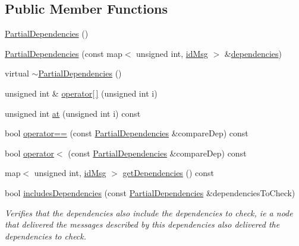 \subsection*{Public Member Functions}
\begin{DoxyCompactItemize}
\item 
\hyperlink{class_partial_dependencies_aefb05dec194a9ab63482df6645cbd842}{Partial\+Dependencies} ()
\item 
\hyperlink{class_partial_dependencies_a1f17aad6d01c7e8cdc40bf99138eb528}{Partial\+Dependencies} (const map$<$ unsigned int, \hyperlink{structures_8h_a83a1d9a070efa5341da84cfd8e28d3e5}{id\+Msg} $>$ \&\hyperlink{class_partial_dependencies_a4b72531ce3a3b7c4b6f02d0fe8ea1a7c}{dependencies})
\item 
virtual \hyperlink{class_partial_dependencies_a8fa3da23d89db5b71b42e234617755f7}{$\sim$\+Partial\+Dependencies} ()
\item 
unsigned int \& \hyperlink{class_partial_dependencies_afafbc86f0bc7c649bcfbddbb90125e8f}{operator\mbox{[}$\,$\mbox{]}} (unsigned int i)
\item 
unsigned int \hyperlink{class_partial_dependencies_ac0a0d04664f3a953596ca26224f5ed7d}{at} (unsigned int i) const
\item 
bool \hyperlink{class_partial_dependencies_a432719e4e5fdcd9cdb0d3a5ce2a5c8af}{operator==} (const \hyperlink{class_partial_dependencies}{Partial\+Dependencies} \&compare\+Dep) const
\item 
bool \hyperlink{class_partial_dependencies_af8f87bc4a622db0f56276502c6655f38}{operator$<$} (const \hyperlink{class_partial_dependencies}{Partial\+Dependencies} \&compare\+Dep) const
\item 
map$<$ unsigned int, \hyperlink{structures_8h_a83a1d9a070efa5341da84cfd8e28d3e5}{id\+Msg} $>$ \hyperlink{class_partial_dependencies_a816f0a770b1d6f3255a1485705e262d2}{get\+Dependencies} () const
\item 
bool \hyperlink{class_partial_dependencies_a4cfd27959669b5b7b58ea07d38824d7b}{includes\+Dependencies} (const \hyperlink{class_partial_dependencies}{Partial\+Dependencies} \&dependencies\+To\+Check)
\begin{DoxyCompactList}\small\item\em Verifies that the dependencies also include the dependencies to check, ie a node that delivered the messages described by this dependencies also delivered the dependencies to check. \end{DoxyCompactList}\item 

\end{DoxyCompactItemize}
